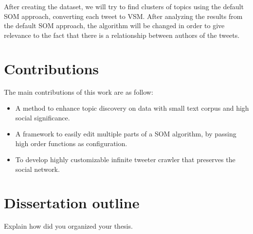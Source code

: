 After creating the dataset, we will try to find clusters of topics using the default \ac{SOM} approach, converting each tweet to \ac{VSM}. After analyzing the results from the default \ac{SOM} approach, the algorithm will be changed in order to give relevance to the fact that there is a relationship between authors of the tweets.

\section{Contributions}
The main contributions of this work are as follow:
\begin{itemize}
  \item A method to enhance topic discovery on data with small text corpus and high social significance.
  \item A framework to easily edit multiple parts of a \ac{SOM} algorithm, by passing high order functions as configuration.
  \item To develop highly customizable infinite tweeter crawler that preserves the social network.  
\end{itemize}

\section{Dissertation outline}
Explain how did you organized your thesis.

\cleardoublepage 
